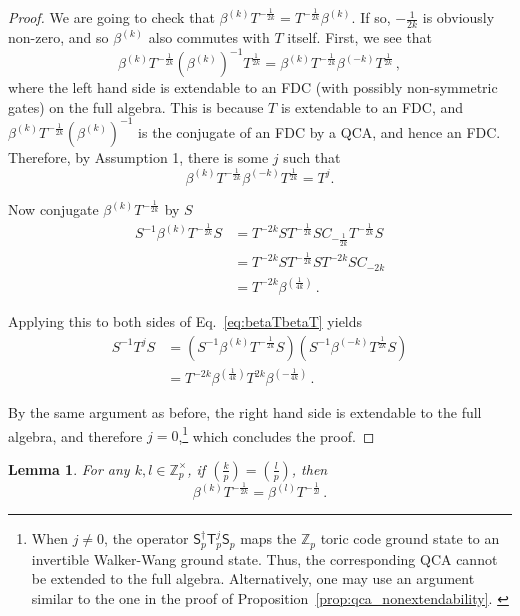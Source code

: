\documentclass[aps,twocolumn,prx,floatfix,preprintnumbers, nofootinbib,10pt]{revtex4-2}
\numberwithin{equation}{section}
\newtheorem{lemma}[theorem]{Lemma}
\theoremstyle{definition}
\theoremstyle{remark}
\theoremstyle{claim}
\newcommand{\be}{\begin{equation}}
\newcommand{\ee}{\end{equation}}
\newcommand{\Z}{{\mathbb Z}}
\newcommand{\paren}[1]{\left( #1 \right)}
\begin{document}
\begin{proof}
 We are going to check that $\beta^{(k)} T^{-\frac{1}{2k}} = T^{-\frac{1}{2k}} \beta^{(k)}$. If so, $-\frac{1}{2k}$ is obviously non-zero, and so $\beta^{(k)}$ also commutes with $T$ itself. First, we see that
 \be
 \beta^{(k)} T^{-\frac{1}{2k}} \paren{\beta^{(k)}}^{-1} T^{\frac{1}{2k}} = \beta^{(k)} T^{-\frac{1}{2k}} \beta^{(-k)} T^{\frac{1}{2k}} \,,
 \ee
 where the left hand side is extendable to an FDC (with possibly non-symmetric gates) on the full algebra. This is because $T$ is extendable to an FDC, and $\beta^{(k)} T^{-\frac{1}{2k}} \paren{\beta^{(k)}}^{-1}$ is the conjugate of an FDC by a QCA, and hence an FDC. Therefore, by Assumption 1, there is some $j$ such that
 \be\label{eq:betaTbetaT}
 \beta^{(k)} T^{-\frac{1}{2k}} \beta^{(-k)} T^{\frac{1}{2k}} = T^j.
 \ee

 Now conjugate $\beta^{(k)} T^{-\frac{1}{2k}}$ by $S$
 \begin{align}
  S^{-1} \beta^{(k)} T^{-\frac{1}{2k}} S &= T^{-2k} S T^{-\frac{1}{2k}} S C_{-\frac{1}{2k}} T^{-\frac{1}{2k}} S \nonumber \\
  &= T^{-2k} S T^{-\frac{1}{2k}} S T^{-2k} S C_{-2k} \nonumber \\
  &= T^{-2k} \beta^{(\frac{1}{4k})} \,. \label{eq: betaTconj}
 \end{align}

 Applying this to both sides of Eq.~\eqref{eq:betaTbetaT} yields
 \begin{align}
  S^{-1} T^j S &= \paren{ S^{-1} \beta^{(k)} T^{-\frac{1}{2k}} S} \paren{S^{-1} \beta^{(-k)} T^{\frac{1}{2k}} S} \nonumber \\
  &= T^{-2k} \beta^{(\frac{1}{4k})} T^{2k} \beta^{(-\frac{1}{4k})} \,.
 \end{align}

 By the same argument as before, the right hand side is extendable to the full algebra, and therefore $j = 0$,\footnote{When $j \neq 0$, the operator $\mathsf{S}_p^{\dagger} \mathsf{T}_p^j \mathsf{S}_p$ maps the $\mathbb{Z}_p$ toric code ground state to an invertible Walker-Wang ground state. Thus, the corresponding QCA cannot be extended to the full algebra. Alternatively, one may use an argument similar to the one in the proof of Proposition~\ref{prop:qca_nonextendability}. \label{fn: Tp centrality}} which concludes the proof.
\end{proof}

\begin{lemma}\label{lem:betaT_from_legendre_symb}
 For any $k, l \in \Z_p^\times$, if $\paren{\frac{k}{p}} = \paren{\frac{l}{p}}$, then
 \be\label{eq:betaT_equalities}
 \beta^{(k)} T^{-\frac{1}{2k}} = \beta^{(l)} T^{-\frac{1}{2l}} \,.
 \ee
\end{lemma}
\end{document}
